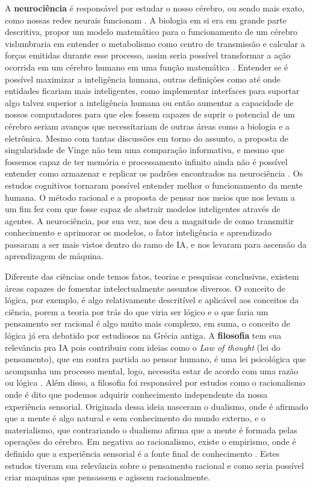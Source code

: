 A \textbf{neurociência} é responsável por estudar o nosso cérebro, ou sendo mais exato, como nossas redes neurais funcionam \cite[10]{russell2003artificial}. A biologia em si era em grande parte descritiva, propor um modelo matemático para o funcionamento de um cérebro vislumbraria em entender o metabolismo como centro de transmissão e calcular a forças emitidas durante esse processo, assim seria possível transformar a ação ocorrida em um cérebro humano em uma função matemática \cite[1-3]{rashevsky1960mathematical}. Entender se é possível maximizar a inteligência humana, outras definições como até onde entidades ficariam mais inteligentes, como implementar interfaces para suportar algo talvez superior a inteligência humana ou então aumentar a capacidade de nossos computadores para que eles fossem capazes de suprir o potencial de um cérebro seriam avanços que necessitariam de outras áreas como a biologia e a eletrônica. Mesmo com tantas discussões em torno do assunto, a proposta de singularidade de Vinge não tem uma comparação informativa, e mesmo que fossemos capaz de ter memória e processamento infinito ainda não é possível entender como armazenar e replicar os padrões encontrados na neurociência \cite[11-12]{vinge1993coming,russell2003artificial}. Os estudos cognitivos tornaram possível entender melhor o funcionamento da mente humana. O método racional e a proposta de pensar nos meios que nos levam a um fim fez com que fosse capaz de abstrair modelos inteligentes através de agentes. A neurociência, por sua vez, nos deu a magnitude de como transmitir conhecimento e aprimorar os modelos, o fator inteligência e aprendizado passaram a ser mais vistos dentro do ramo de IA, e nos levaram para ascensão da aprendizagem de máquina.

Diferente das ciências onde temos fatos, teorias e pesquisas conclusivas, existem áreas capazes de fomentar intelectualmente assuntos diversos. O conceito de lógica, por exemplo, é algo relativamente descritível e aplicável aos conceitos da ciência, porem a teoria por trás do que viria ser lógico e o que faria um pensamento ser racional é algo muito mais complexo, em suma, o conceito de lógica já era debatido por estudiosos na Grécia antiga. A \textbf{filosofia} tem sua relevância pra IA pois contribuiu com ideias como o \textit{Law of thought} (lei do pensamento), que em contra partida ao pensar humano, é uma lei psicológica que acompanha um processo mental, logo, necessita estar de acordo com uma razão ou lógica \cite[4-5]{frege1956thought russell2003artificial }. Além disso, a filosofia foi responsável por estudos como o racionalismo onde é dito que podemos adquirir conhecimento independente da nossa experiência sensorial. Originada dessa ideia nasceram o dualismo, onde é afirmado que a mente é algo natural e sem conhecimento do mundo externo, e o materialismo, que contrariando o dualismo afirma que a mente é formada pelas operações do cérebro. Em negativa ao racionalismo, existe o empirismo, onde é definido que a experiência sensorial é a fonte final de conhecimento \cite[6]{rationalismvsempiricism, descartes2013rene, russell2003artificial}. Estes estudos tiveram sua relevância sobre o pensamento racional e como seria possível criar maquinas que pensassem e agissem racionalmente.
